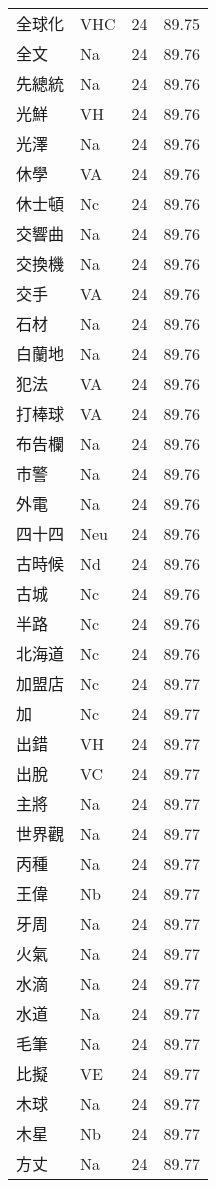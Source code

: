 \documentclass[twocolumn]{book}
\begin{document}
\begin{supertabular}{llrr}
全球化 & VHC & 24 &  89.75\\
全文 & Na & 24 &  89.76\\
先總統 & Na & 24 &  89.76\\
光鮮 & VH & 24 &  89.76\\
光澤 & Na & 24 &  89.76\\
休學 & VA & 24 &  89.76\\
休士頓 & Nc & 24 &  89.76\\
交響曲 & Na & 24 &  89.76\\
交換機 & Na & 24 &  89.76\\
交手 & VA & 24 &  89.76\\
石材 & Na & 24 &  89.76\\
白蘭地 & Na & 24 &  89.76\\
犯法 & VA & 24 &  89.76\\
打棒球 & VA & 24 &  89.76\\
布告欄 & Na & 24 &  89.76\\
市警 & Na & 24 &  89.76\\
外電 & Na & 24 &  89.76\\
四十四 & Neu & 24 &  89.76\\
古時候 & Nd & 24 &  89.76\\
古城 & Nc & 24 &  89.76\\
半路 & Nc & 24 &  89.76\\
北海道 & Nc & 24 &  89.76\\
加盟店 & Nc & 24 &  89.77\\
加 & Nc & 24 &  89.77\\
出錯 & VH & 24 &  89.77\\
出脫 & VC & 24 &  89.77\\
主將 & Na & 24 &  89.77\\
世界觀 & Na & 24 &  89.77\\
丙種 & Na & 24 &  89.77\\
王偉 & Nb & 24 &  89.77\\
牙周 & Na & 24 &  89.77\\
火氣 & Na & 24 &  89.77\\
水滴 & Na & 24 &  89.77\\
水道 & Na & 24 &  89.77\\
毛筆 & Na & 24 &  89.77\\
比擬 & VE & 24 &  89.77\\
木球 & Na & 24 &  89.77\\
木星 & Nb & 24 &  89.77\\
方丈 & Na & 24 &  89.77\\

\end{supertabular}
\end{document}
